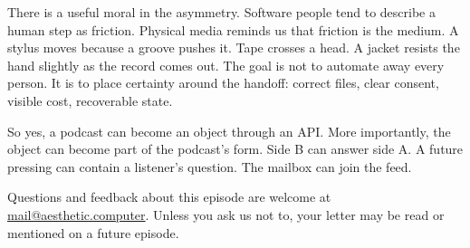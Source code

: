 \documentclass[11pt,letterpaper]{article}
\begin{document}
There is a useful moral in the asymmetry. Software people tend to describe a human step as friction. Physical media reminds us that friction is the medium. A stylus moves because a groove pushes it. Tape crosses a head. A jacket resists the hand slightly as the record comes out. The goal is not to automate away every person. It is to place certainty around the handoff: correct files, clear consent, visible cost, recoverable state.

So yes, a podcast can become an object through an API. More importantly, the object can become part of the podcast's form. Side B can answer side A. A future pressing can contain a listener's question. The mailbox can join the feed.

Questions and feedback about this episode are welcome at \href{mailto:mail@aesthetic.computer}{mail@aesthetic.computer}. Unless you ask us not to, your letter may be read or mentioned on a future episode.

\end{document}
